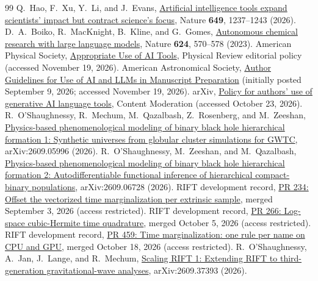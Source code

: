 \documentclass[aps,prd,reprint,nofootinbib]{revtex4-2}
\begin{document}
\begin{thebibliography}{99}
Q.~Hao, F.~Xu, Y.~Li, and J.~Evans,
\href{https://doi.org/10.1038/s41586-025-09922-y}{Artificial intelligence tools expand scientists' impact but contract science's focus}, Nature \textbf{649}, 1237--1243 (2026).
D.~A.~Boiko, R.~MacKnight, B.~Kline, and G.~Gomes,
\href{https://doi.org/10.1038/s41586-023-06792-0}{Autonomous chemical research with large language models}, Nature \textbf{624}, 570--578 (2023).
American Physical Society, \href{https://journals.aps.org/authors/appropriate-use-ai-tools}{Appropriate Use of AI Tools}, Physical Review editorial policy (accessed November 19, 2026).
American Astronomical Society, \href{https://journals.aas.org/author-llm-guidelines}{Author Guidelines for Use of AI and LLMs in Manuscript Preparation} (initially posted September 9, 2026; accessed November 19, 2026).
arXiv, \href{https://info.arxiv.org/help/moderation/index.html#policy-for-authors-use-of-generative-ai-language-tools}{Policy for authors' use of generative AI language tools}, Content Moderation (accessed October 23, 2026).
R.~O'Shaughnessy, R.~Mechum, M.~Qazalbash, Z.~Rosenberg, and M.~Zeeshan,
\href{https://arxiv.org/abs/2609.05996}{Physics-based phenomenological modeling of binary black hole hierarchical formation 1: Synthetic universes from globular cluster simulations for GWTC}, arXiv:2609.05996 (2026).
R.~O'Shaughnessy, M.~Zeeshan, and M.~Qazalbash,
\href{https://arxiv.org/abs/2609.06728}{Physics-based phenomenological modeling of binary black hole hierarchical formation 2: Autodifferentiable functional inference of hierarchical compact-binary populations}, arXiv:2609.06728 (2026).
RIFT development record, \href{https://github.com/oshaughnessy-junior/research-projects-RIT/pull/234}{PR 234: Offset the vectorized time marginalization per extrinsic sample}, merged September 3, 2026 (access restricted).
RIFT development record, \href{https://github.com/oshaughnessy-junior/research-projects-RIT/pull/266}{PR 266: Log-space cubic-Hermite time quadrature}, merged October 5, 2026 (access restricted).
RIFT development record, \href{https://github.com/oshaughnessy-junior/research-projects-RIT/pull/459}{PR 459: Time marginalization: one rule per name on CPU and GPU}, merged October 18, 2026 (access restricted).
R.~O'Shaughnessy, A.~Jan, J.~Lange, and R.~Mechum,
\href{https://arxiv.org/abs/2609.37393}{Scaling RIFT 1: Extending RIFT to third-generation gravitational-wave analyses}, arXiv:2609.37393 (2026).

\end{thebibliography}
\end{document}
